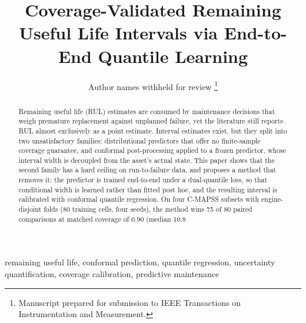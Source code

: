 ﻿\documentclass[journal]{IEEEtran}
\begin{document}
\title{Coverage-Validated Remaining Useful Life Intervals via End-to-End Quantile Learning}

\author{Author names withheld for review%
\thanks{Manuscript prepared for submission to IEEE Transactions on Instrumentation and Measurement.}}

\maketitle

\begin{abstract}
Remaining useful life (RUL) estimates are consumed by maintenance decisions that weigh premature replacement against unplanned failure, yet the literature still reports RUL almost exclusively as a point estimate. Interval estimates exist, but they split into two unsatisfactory families: distributional predictors that offer no finite-sample coverage guarantee, and conformal post-processing applied to a frozen predictor, whose interval width is decoupled from the asset's actual state. This paper shows that the second family has a hard ceiling on run-to-failure data, and proposes a method that removes it: the predictor is trained end-to-end under a dual-quantile loss, so that conditional width is learned rather than fitted post hoc, and the resulting interval is calibrated with conformal quantile regression. On four C-MAPSS subsets with engine-disjoint folds (80 training cells, four seeds), the method wins 75 of 80 paired comparisons at matched coverage of 0.90 (median 10.8\\%
\end{abstract}

\begin{IEEEkeywords}
remaining useful life, conformal prediction, quantile regression, uncertainty quantification, coverage calibration, predictive maintenance
\end{IEEEkeywords}
\end{document}
